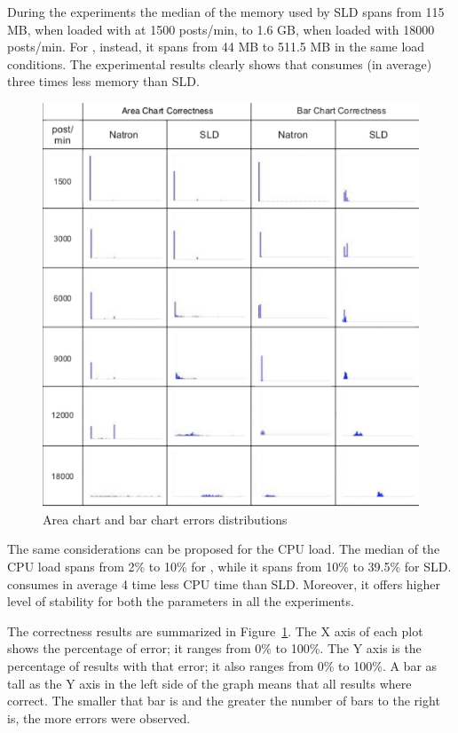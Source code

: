 During the experiments the median of the  memory used by SLD spans from 115 MB, when loaded with at 1500 posts/min, to 1.6 GB, when loaded with 18000 posts/min. For \sti{}, instead, it spans from 44 MB to 511.5 MB in the same load conditions. The experimental results clearly shows that \sti{} consumes (in average) three times less memory than SLD.

\begin{figure}[p]
\centering
\includegraphics[width=\textwidth]{img/comp-mod-errors}
\caption{Area chart and bar chart errors distributions}
\label{fig:errors}
\end{figure}

The same considerations can be proposed for the CPU load. The median of the CPU load spans  from 2\% to 10\% for \sti{}, while it spans from 10\% to 39.5\% for SLD. \sti{} consumes in average 4 time less CPU time than SLD. 
Moreover, it offers higher level of stability for both the parameters in all the experiments. 

The correctness results are summarized in Figure~\ref{fig:errors}. The X axis of each plot shows the percentage of error; it ranges from 0\% to 100\%. The Y axis is the percentage of results with that error; it also ranges from 0\% to 100\%. A bar as tall as the Y axis in the left side of the graph means that all results where correct. The smaller that bar is and the greater the number of bars to the right is, the more errors were observed.

